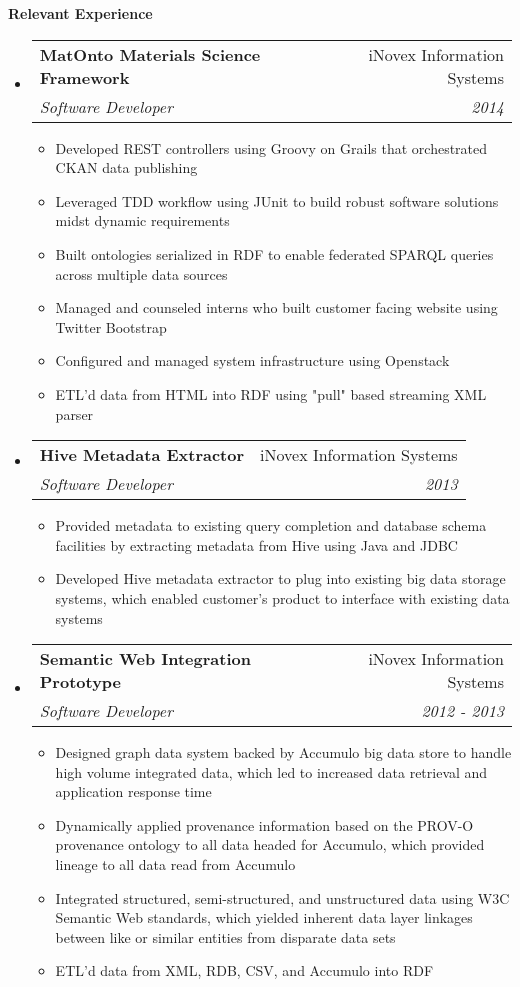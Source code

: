 \documentclass[letterpaper,11pt]{article}
\makeatletter
\newcommand{\resitem}[1]{\item #1 \vspace{-2pt}}
\newcommand{\resheading}[1]{{\large \colorbox{mygrey}{\begin{minipage}{\textwidth}{\textbf{#1 \vphantom{p\^{E}}}}\end{minipage}}}}
\newcommand{\ressubheading}[4]{
\begin{tabular*}{7.0in}{l@{\extracolsep{\fill}}r}
		\textbf{#1} & #2 \\
		\textit{#3} & \textit{#4} \\
\end{tabular*}\vspace{-6pt}}
\makeatother
\begin{document}
\resheading{Relevant Experience}
\begin{itemize}
	\item
	\ressubheading{MatOnto Materials Science Framework}{iNovex Information Systems}{Software Developer}{2014}
	\begin{itemize}
		\resitem{Developed REST controllers using Groovy on Grails that orchestrated CKAN data publishing}
		\resitem{Leveraged TDD workflow using JUnit to build robust software solutions midst dynamic requirements}
		\resitem{Built ontologies serialized in RDF to enable federated SPARQL queries across multiple data sources}
		\resitem{Managed and counseled interns who built customer facing website using Twitter Bootstrap}
		\resitem{Configured and managed system infrastructure using Openstack}
		\resitem{ETL'd data from HTML into RDF using "pull" based streaming XML parser}
	\end{itemize}

	\item
	\ressubheading{Hive Metadata Extractor}{iNovex Information Systems}{Software Developer}{2013}
	\begin{itemize}
		\resitem{Provided metadata to existing query completion and database schema facilities by extracting metadata from Hive using Java and JDBC}
		\resitem{Developed Hive metadata extractor to plug into existing big data storage systems, which enabled customer's product to interface with existing data systems}
	\end{itemize}
	
	\item
	\ressubheading{Semantic Web Integration Prototype}{iNovex Information Systems}{Software Developer}{2012 - 2013}
	\begin{itemize}
		\resitem{Designed graph data system backed by Accumulo big data store to handle high volume integrated data, which led to increased data retrieval and application response time}
		\resitem{Dynamically applied provenance information based on the PROV-O provenance ontology to all data headed for Accumulo, which provided lineage to all data read from Accumulo}
		\resitem{Integrated structured, semi-structured, and unstructured data using W3C Semantic Web standards, which yielded inherent data layer linkages between like or similar entities from disparate data sets}
		\resitem{ETL'd data from XML, RDB, CSV, and Accumulo into RDF}
	\end{itemize}
	
\end{itemize}
\end{document}
